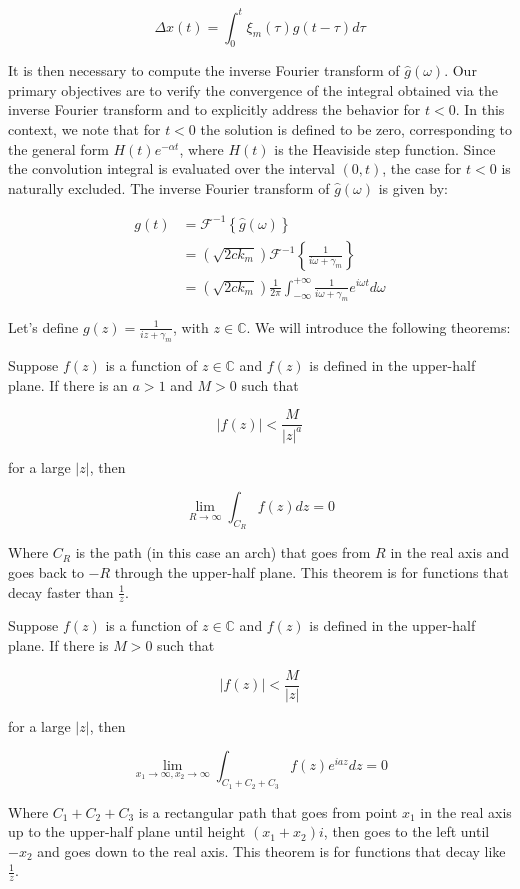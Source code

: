 \begin{equation*}
    \Delta x(t) = \int_0^t\xi_m(\tau)g(t-\tau)d\tau
\end{equation*}

It is then necessary to compute the inverse Fourier transform of $\hat{g}(\omega)$. Our primary objectives are to verify the convergence of the integral obtained via the inverse Fourier transform and to explicitly address the behavior for $t<0$. In this context, we note that for $t<0$ the solution is defined to be zero, corresponding to the general form $H(t)e^{-\alpha t}$, where $H(t)$ is the Heaviside step function. Since the convolution integral is evaluated over the interval $(0,t)$, the case for $t<0$ is naturally excluded. The inverse Fourier transform of $\hat{g}(\omega)$ is given by:

\begin{align*}
g(t) &= \mathcal{F}^{-1}\left\{\hat{g}(\omega)\right\}\\
&= \left(\sqrt{2ck_m}\right)\mathcal{F}^{-1}\left\{\frac{1}{i\omega+\gamma_m}\right\}\\ 
&= \left(\sqrt{2ck_m}\right)\frac{1}{2\pi}\int_{-\infty}^{+\infty}\frac{1}{i\omega+\gamma_m}e^{i\omega t}d\omega
\end{align*}

Let's define $g(z) = \frac{1}{iz+\gamma_m}$, with $z\in\mathbb{C}$. We will introduce the following theorems:

\begin{untheorem}
    Suppose $f(z)$ is a function of $z\in\mathbb{C}$ and $f(z)$ is defined in the upper-half plane. If there is an $a>1$ and $M>0$ such that

    $$
    \left|f(z)\right| < \frac{M}{\left|z\right|^a}
    $$
  
    for a large $\left|z\right|$, then 
  
    $$
    \lim_{R\to\infty}\int_{C_R}f(z)dz = 0
    $$
  
    Where $C_R$ is the path (in this case an arch) that goes from $R$ in the real axis and goes back to $-R$ through the upper-half plane. This theorem is for functions that decay faster than $\frac{1}{z}$.
\end{untheorem}

\begin{untheorem}\label{theorem:complex_square}
    Suppose $f(z)$ is a function of $z\in\mathbb{C}$ and $f(z)$ is defined in the upper-half plane. If there is $M>0$ such that

    $$
    \left|f(z)\right| < \frac{M}{\left|z\right|}
    $$
  
    for a large $\left|z\right|$, then 
  
    $$
    \lim_{x_1\to\infty,x_2\to\infty}\int_{C_1+C_2+C_3}f(z)e^{iaz}dz = 0
    $$
  
    Where $C_1+C_2+C_3$ is a rectangular path that goes from point $x_1$ in the real axis up to the upper-half plane until height $(x_1+x_2)i$, then goes to the left until $-x_2$ and goes down to the real axis. This theorem is for functions that decay like $\frac{1}{z}$.
\end{untheorem}


